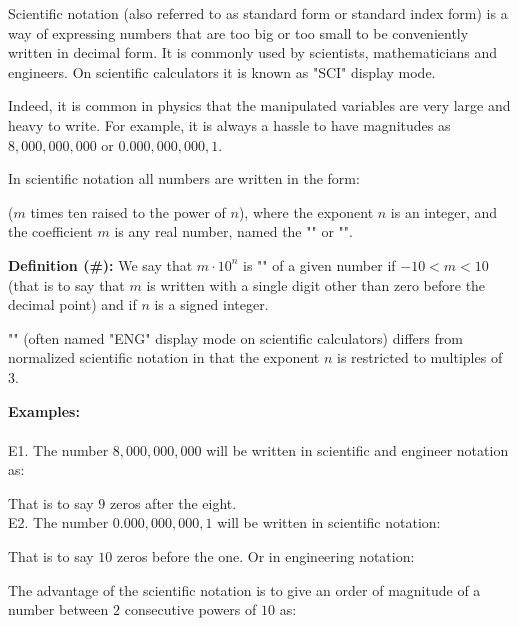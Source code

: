 	Scientific notation (also referred to as standard form or standard index form) is a way of expressing numbers that are too big or too small to be conveniently written in decimal form. It is commonly used by scientists, mathematicians and engineers. On scientific calculators it is known as "SCI" display mode.
	
	Indeed, it is common in physics that the manipulated variables are very large and heavy to write. For example, it is always a hassle to have magnitudes as $8,000,000,000$ or $0.000,000,000,1$.
	
	In scientific notation all numbers are written in the form:
	
	($m$ times ten raised to the power of $n$), where the exponent $n$ is an integer, and the coefficient $m$ is any real number, named the "" or "".
	
	\textbf{Definition (\#\mydef):} We say that $m\cdot 10^n$ is "" of a given number if $-10 < m <10$ (that is to say that $m$ is written with a single digit other than zero before the decimal point) and if $n$ is a signed integer.
	
	\begin{tcolorbox}[title=Remark,colframe=black,arc=10pt]
	"" (often named "ENG" display mode on scientific calculators) differs from normalized scientific notation in that the exponent $n$ is restricted to multiples of $3$.
	\end{tcolorbox}
	
	\begin{tcolorbox}[colframe=black,colback=white,sharp corners]
	\textbf{{\Large {}}Examples:}\\\\
	E1. The number $8,000,000,000$ will be written in scientific and engineer notation as:
	
	That is to say $9$ zeros after the eight.\\
	
	E2. The number $0.000,000,000,1$ will be written in scientific notation:
	
	That is to say $10$ zeros before the one. Or in engineering notation:
	
	\end{tcolorbox}
	The advantage of the scientific notation is to give an order of magnitude of a number between $2$ consecutive powers of $10$ as:
	
